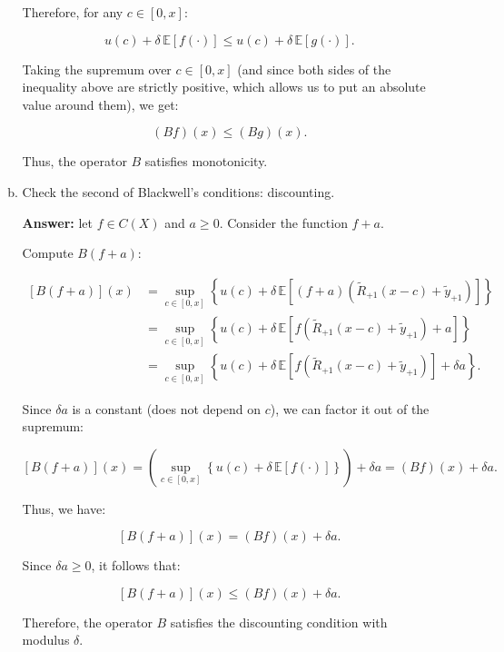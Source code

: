 \documentclass[11pt]{extarticle}
\theoremstyle{plain}
\theoremstyle{definition}
\begin{document}
\begin{enumerate}[(a)]
\begin{enumerate}[(a)]
Therefore, for any $c \in [0, x]$:

\[
u(c) + \delta \, \mathbb{E} \left[ f\left( \cdot \right) \right] \leq u(c) + \delta \, \mathbb{E} \left[ g\left( \cdot \right) \right].
\]

Taking the supremum over $c \in [0, x]$ (and since both sides of the inequality above are strictly positive, which allows us to put an absolute value around them), we get:

\[
(Bf)(x) \leq (Bg)(x).
\]

Thus, the operator $B$ satisfies monotonicity.


\item Check the second of Blackwell's conditions: discounting.

\textbf{Answer:}  let $f \in C(X)$ and $a \geq 0$. Consider the function $f + a$.

Compute $B(f + a)$:

\[
\begin{aligned}
[B(f + a)](x) &= \sup_{c \in [0, x]} \left\{ u(c) + \delta \, \mathbb{E} \left[ (f + a)\left( \tilde{R}_{+1}(x - c) + \tilde{y}_{+1} \right) \right] \right\} \\
&= \sup_{c \in [0, x]} \left\{ u(c) + \delta \, \mathbb{E} \left[ f\left( \tilde{R}_{+1}(x - c) + \tilde{y}_{+1} \right) + a \right] \right\} \\
&= \sup_{c \in [0, x]} \left\{ u(c) + \delta \, \mathbb{E} \left[ f\left( \tilde{R}_{+1}(x - c) + \tilde{y}_{+1} \right) \right] + \delta a \right\}.
\end{aligned}
\]

Since $\delta a$ is a constant (does not depend on $c$), we can factor it out of the supremum:

\[
[B(f + a)](x) = \left( \sup_{c \in [0, x]} \left\{ u(c) + \delta \, \mathbb{E} \left[ f\left( \cdot \right) \right] \right\} \right) + \delta a = (Bf)(x) + \delta a.
\]

Thus, we have:

\[
[B(f + a)](x) = (Bf)(x) + \delta a.
\]

Since $\delta a \geq 0$, it follows that:

\[
[B(f + a)](x) \leq (Bf)(x) + \delta a.
\]

Therefore, the operator $B$ satisfies the discounting condition with modulus $\delta$.

\end{enumerate}

\vspace{5mm}

\end{enumerate}
\end{document}
